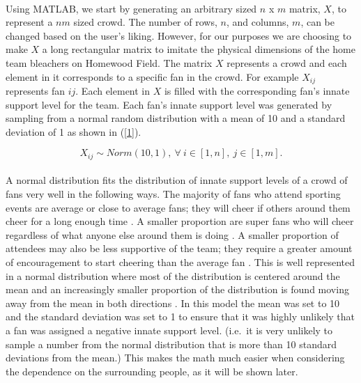 \documentclass[oneside,12pt]{report}
\begin{document}
\paragraph{}
Using MATLAB, we start by generating an arbitrary sized $n$ x $m$ matrix, $X$, to represent a $nm$ sized crowd. The number of rows, $n$, and columns, $m$, can be changed based on the user's liking. However, for our purposes we are choosing to make $X$ a long rectangular matrix to imitate the physical dimensions of the home team bleachers on Homewood Field. The matrix $X$ represents a crowd and each element in it corresponds to a specific fan in the crowd. For example $X_{ij}$ represents fan $ij$. Each element in $X$ is filled with the corresponding fan's innate support level for the team. Each fan's innate support level was generated by sampling from a normal random distribution with a mean of 10 and a standard deviation of 1 as shown in (\ref{1}). 

\begin{equation}
X_{ij}\sim Norm(10,1),~\forall~i\in[1,n],~j\in[1,m].
\label{1}
\end{equation}

\paragraph{}
A normal distribution fits the distribution of innate support levels of a crowd of fans very well in the following ways. The majority of fans who attend sporting events are average or close to average fans; they will cheer if others around them cheer for a long enough time \cite{DI2003}. A smaller proportion are super fans who will cheer regardless of what anyone else around them is doing \cite{DI2003}. A smaller proportion of attendees may also be less supportive of the team; they require a greater amount of encouragement to start cheering than the average fan \cite{DI2003}. This is well represented in a normal distribution where most of the distribution is centered around the mean and an increasingly smaller proportion of the distribution is found moving away from the mean in both directions \cite{DI2003}. In this model the mean was set to 10 and the standard deviation was set to 1 to ensure that it was highly unlikely that a fan was assigned a negative innate support level. (i.e.~it is very unlikely to sample a number from the normal distribution that is more than 10 standard deviations from the mean.) This makes the math much easier when considering the dependence on the surrounding people, as it will be shown later.
\end{document}

